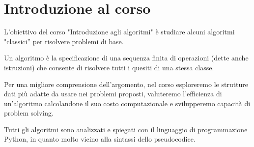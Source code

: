 \chapter*{Introduzione al corso}

L'obiettivo del corso "Introduzione agli algoritmi" è studiare alcuni algoritmi "classici” per risolvere problemi di base. 

Un algoritmo è la specificazione di una sequenza finita di operazioni (dette anche istruzioni) che consente di risolvere tutti i quesiti di una stessa classe.

Per una migliore comprensione dell'argomento, nel corso esploreremo le strutture dati più adatte da usare nei problemi proposti, valuteremo l'efficienza di un'algoritmo calcolandone il suo costo computazionale e svilupperemo capacità di problem solving.

Tutti gli algoritmi sono analizzati e spiegati con il linguaggio di programmazione Python, in quanto molto vicino alla sintassi dello pseudocodice.